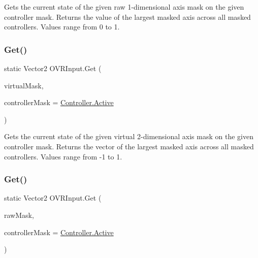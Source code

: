 Gets the current state of the given raw 1-\/dimensional axis mask on the given controller mask. Returns the value of the largest masked axis across all masked controllers. Values range from 0 to 1. 

\mbox{\label{class_o_v_r_input_a9f50a4960aff3d92d98d3661d0321fd8}} 
\subsubsection{\texorpdfstring{Get()}{Get()}\hspace{0.1cm}{\footnotesize\ttfamily [9/10]}}
{\footnotesize\ttfamily static Vector2 O\+V\+R\+Input.\+Get (\begin{DoxyParamCaption}\item[{\mbox{\hyperlink{class_o_v_r_input_a8d8de8321e36e4c5c3b5266b72468d8a}{Axis2D}}}]{virtual\+Mask,  }\item[{\mbox{\hyperlink{class_o_v_r_input_a5c86f9052a9cbb0b73779ff5704d60a8}{Controller}}}]{controller\+Mask = {\ttfamily \mbox{\hyperlink{class_o_v_r_input_a5c86f9052a9cbb0b73779ff5704d60a8a4d3d769b812b6faa6b76e1a8abaece2d}{Controller.\+Active}}} }\end{DoxyParamCaption})\hspace{0.3cm}{\ttfamily [static]}}



Gets the current state of the given virtual 2-\/dimensional axis mask on the given controller mask. Returns the vector of the largest masked axis across all masked controllers. Values range from -\/1 to 1. 

\mbox{\label{class_o_v_r_input_affa601653694045986dd68f3edd21b6b}} 
\subsubsection{\texorpdfstring{Get()}{Get()}\hspace{0.1cm}{\footnotesize\ttfamily [10/10]}}
{\footnotesize\ttfamily static Vector2 O\+V\+R\+Input.\+Get (\begin{DoxyParamCaption}\item[{\mbox{\hyperlink{class_o_v_r_input_a973c161bfb3bd6d0cc16c3a0b56c9f4a}{Raw\+Axis2D}}}]{raw\+Mask,  }\item[{\mbox{\hyperlink{class_o_v_r_input_a5c86f9052a9cbb0b73779ff5704d60a8}{Controller}}}]{controller\+Mask = {\ttfamily \mbox{\hyperlink{class_o_v_r_input_a5c86f9052a9cbb0b73779ff5704d60a8a4d3d769b812b6faa6b76e1a8abaece2d}{Controller.\+Active}}} }\end{DoxyParamCaption})\hspace{0.3cm}{\ttfamily [static]}}



